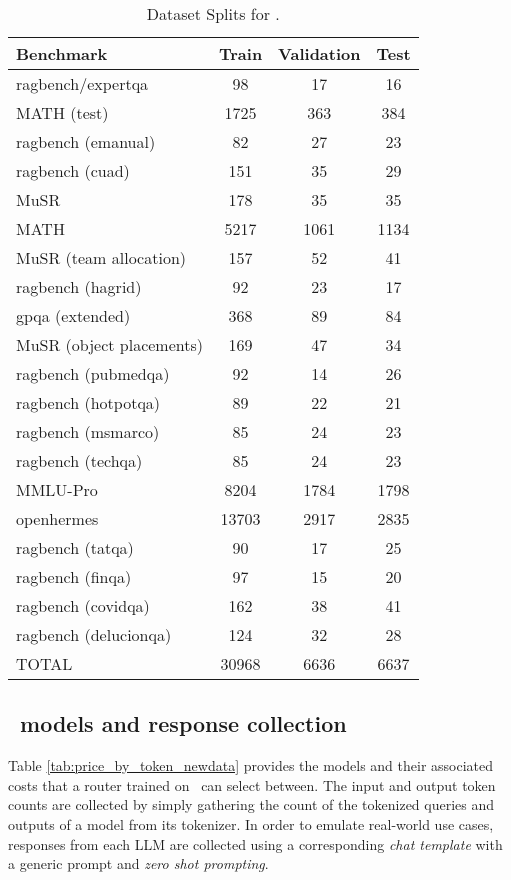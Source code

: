 \begin{table}
    \centering
        \caption{Dataset Splits for \newdata.}
    \begin{tabular}{lccc}
        \toprule
        \textbf{Benchmark} & \textbf{Train} & \textbf{Validation} & \textbf{Test} \\
        \midrule
        ragbench/expertqa & 98 & 17 & 16 \\
        MATH (test) & 1725 & 363 & 384 \\
        ragbench (emanual) & 82 & 27 & 23 \\
        ragbench (cuad) & 151 & 35 & 29 \\
        MuSR & 178 & 35 & 35 \\
        MATH & 5217 & 1061 & 1134 \\
        MuSR (team allocation) & 157 & 52 & 41 \\
        ragbench (hagrid) & 92 & 23 & 17 \\
        gpqa (extended) & 368 & 89 & 84 \\
        MuSR (object placements) & 169 & 47 & 34 \\
        ragbench (pubmedqa) & 92 & 14 & 26 \\
        ragbench (hotpotqa) & 89 & 22 & 21 \\
        ragbench (msmarco) & 85 & 24 & 23 \\
        ragbench (techqa) & 85 & 24 & 23 \\
        MMLU-Pro & 8204 & 1784 & 1798 \\
        openhermes & 13703 & 2917 & 2835 \\
        ragbench (tatqa) & 90 & 17 & 25 \\
        ragbench (finqa) & 97 & 15 & 20 \\
        ragbench (covidqa) & 162 & 38 & 41 \\
        ragbench (delucionqa) & 124 & 32 & 28 \\
        TOTAL & 30968 & 6636 & 6637 \\
        \bottomrule
    \end{tabular}

    \label{tab:dataset_splits}
\end{table}

\subsection{\newdata\ models and response collection}
\label{sec: sprout collection}
Table \ref{tab:price_by_token_newdata} provides the models and their associated costs that a router trained on \newdata\ can select between. The input and output token counts are collected by simply gathering the count of the tokenized queries and outputs of a model from its tokenizer. In order to emulate real-world use cases, responses from each LLM are collected using a corresponding \emph{chat template} with a generic prompt and \emph{zero shot prompting}.

